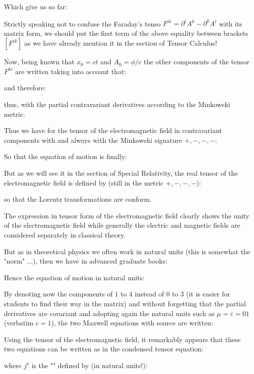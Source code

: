 	Which give us so far:
	
	\begin{tcolorbox}[title=Remark,colframe=black,arc=10pt]
	Strictly speaking not to confuse the Faraday's tenso $F^{ik}=\partial^iA^k-\partial^kA^i$ with its matrix form, we should put the first term of the above equality between brackets $[F^{ik}]$ as we have already mention it in the section of Tensor Calculus!
	\end{tcolorbox}
	Now, being known that $x_0=ct$ and $A_0=\phi/c$ the other components of the tensor $F^{ki}$ are written taking into account that:
	
	and therefore:
	
	thus, with the partial contravariant  derivatives according to the Minkowski metric:
	
	Thus we have for the tensor of the electromagnetic field in contravariant components with and always with the Minkowski signature $+, -, -, -$:
	
	So that the equation of motion is finally:
	
	But as we will see it in the section of Special Relativity, the real tensor of the electromagnetic field is defined by (still in the metric $+, -, -, -$):	
	
	so that the Lorentz transformations are conform.

	The expression in tensor form of the electromagnetic field clearly shows the unity of the electromagnetic field while generally the electric and magnetic fields are considered separately in classical theory.

	But as in theoretical physics we often work in natural units (this is somewhat the "norm" ...), then we have in advanced graduate books:
	
	Hence the equation of motion in natural units:
	
	By denoting now the components of $1$ to $4$ instead of $0$ to $3$ (it is easier for students to find their way in the matrix) and without forgetting that the partial derivatives are covariant and adopting again the natural units such as $\mu=\varepsilon=01$ (verbatim $c=1$), the two Maxwell equations with source are written:
	
	Using the tensor of the electromagnetic field, it remarkably appears that these two equations can be written as in the condensed tensor equation:
	
	where $j^\nu$ is the "" defined by (in natural units!):
	
